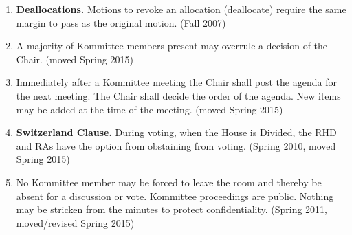 \documentclass[12pt]{article}
\begin{document}
\begin{enumerate}[1.]
\begin{enumerate}[A.]
\item No discussion of the Member being impeached may occur without that member present unless chronic absence from Kommittee is cited as reason for the impeachment.
\item The Chair, or acting Chair, may open or close the floor to further discussion at their option. Any person present may motion to call the question.
\item In the interest of impartialty, should A Vote of No Confidence be initiated against the Chair, the Minister-of-Letters shall be acting-Chair for the duration of the discussion.
\item Balloting Procedure
\begin{enumerate}[i.]
\item All votes shall be cast by secret ballot with either a vote of "Confidence", "No Confidence", or "Abstain" and tallied by the propogandist, or the Minister-of-Letters should the Propogandist be the subject of the motion.
\item Only Kommittee Members may vote.
\item Should 3/4 of all ballots cast read "No Confidence" the Member in question is immediately removed from office.
\begin{enumerate}[a.]
\item The vacancy created by impeachment shall immediately be filled by a temporary appointee by the Chair or acting-Chair subject to a vote of approval by all present at Kommittee.
\item Nominations will be taken for a replacement up until 48 hours before the next Kommittee Meeting and a Special Election per Restricted Policy 6 will take place the following week to select a replacement for the remaining term.
\end{enumerate}
\end{enumerate}
\end{enumerate}
(rev. Spring 2015)
\item \textbf{Deallocations.} Motions to revoke an allocation (deallocate) require the same margin to pass as the original motion. (Fall 2007)
\item A majority of Kommittee members present may overrule a decision of the Chair. (moved Spring 2015)
\item Immediately after a Kommittee meeting the Chair shall post the agenda for the next meeting. The Chair shall decide the order of the agenda. New items may be added at the time of the meeting. (moved Spring 2015)
\item \textbf{Switzerland Clause.} During voting, when the House is Divided, the RHD and RAs have the option from obstaining from voting. (Spring 2010, moved Spring 2015)
\item No Kommittee member may be forced to leave the room and thereby be absent for a discussion or vote.  Kommittee proceedings are public. Nothing may be stricken from the minutes to protect confidentiality. (Spring 2011, moved/revised Spring 2015)
\end{enumerate}
\end{document}
